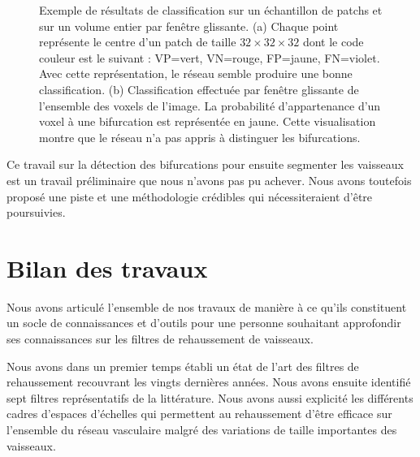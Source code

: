 \begin{figure}[!ht]
    \captionsetup[subfigure]{justification=centering}
    \centering
    \begin{subfigure}{0.48\textwidth}
        \caption{}
    \end{subfigure}
    \begin{subfigure}{0.48\textwidth}
    \caption{}
    \end{subfigure}
    \caption{Exemple de résultats de classification sur un échantillon de patchs et sur un volume entier par fenêtre glissante. (a) Chaque point représente le centre d'un patch de taille $32 \times 32 \times 32$ dont le code couleur est le suivant : VP=vert, VN=rouge, FP=jaune, FN=violet. Avec cette représentation, le réseau semble produire une bonne classification. (b) Classification effectuée par fenêtre glissante de l'ensemble des voxels de l'image. La probabilité d'appartenance d'un voxel à une bifurcation est représentée en jaune. Cette visualisation montre que le réseau n'a pas appris à distinguer les bifurcations.}
    \label{fig:inference_patches_vs_sliding_window}
\end{figure}

Ce travail sur la détection des bifurcations pour ensuite segmenter les vaisseaux est un travail préliminaire que nous n'avons pas pu achever. Nous avons toutefois proposé une piste et une méthodologie crédibles qui nécessiteraient d'être poursuivies.

\section{ Bilan des travaux}

Nous avons articulé l'ensemble de nos travaux de manière à ce qu'ils constituent un socle de connaissances et d'outils pour une personne souhaitant approfondir ses connaissances sur les filtres de rehaussement de vaisseaux. 

Nous avons dans un premier temps établi un état de l'art des filtres de rehaussement recouvrant les vingts dernières années. Nous avons ensuite identifié sept filtres représentatifs de la littérature. Nous avons aussi explicité les différents cadres d'espaces d'échelles qui permettent au rehaussement d'être efficace sur l'ensemble du réseau vasculaire malgré des variations de taille importantes des vaisseaux.

